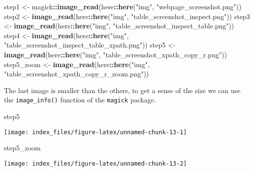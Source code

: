 \documentclass[
]{article}
\newenvironment{Shaded}{\begin{snugshade}}{\end{snugshade}}
\newcommand{\KeywordTok}[1]{\textcolor[rgb]{0.13,0.29,0.53}{\textbf{#1}}}
\newcommand{\NormalTok}[1]{#1}
\newcommand{\OperatorTok}[1]{\textcolor[rgb]{0.81,0.36,0.00}{\textbf{#1}}}
\newcommand{\StringTok}[1]{\textcolor[rgb]{0.31,0.60,0.02}{#1}}
\begin{document}
\begin{Shaded}
\begin{Highlighting}[]
\NormalTok{step1 <-}\StringTok{ }\NormalTok{magick}\OperatorTok{::}\KeywordTok{image_read}\NormalTok{(here}\OperatorTok{::}\KeywordTok{here}\NormalTok{(}\StringTok{"img"}\NormalTok{, }\StringTok{"webpage_screenshot.png"}\NormalTok{))}
\NormalTok{step2 <-}\StringTok{ }\KeywordTok{image_read}\NormalTok{(here}\OperatorTok{::}\KeywordTok{here}\NormalTok{(}\StringTok{"img"}\NormalTok{, }\StringTok{"table_screenshot_inspect.png"}\NormalTok{))}
\NormalTok{step3 <-}\StringTok{ }\KeywordTok{image_read}\NormalTok{(here}\OperatorTok{::}\KeywordTok{here}\NormalTok{(}\StringTok{"img"}\NormalTok{, }\StringTok{"table_screenshot_inspect_table.png"}\NormalTok{))}
\NormalTok{step4 <-}\StringTok{ }\KeywordTok{image_read}\NormalTok{(here}\OperatorTok{::}\KeywordTok{here}\NormalTok{(}\StringTok{"img"}\NormalTok{, }\StringTok{"table_screenshot_inspect_table_xpath.png"}\NormalTok{))}
\NormalTok{step5 <-}\StringTok{ }\KeywordTok{image_read}\NormalTok{(here}\OperatorTok{::}\KeywordTok{here}\NormalTok{(}\StringTok{"img"}\NormalTok{, }\StringTok{"table_screenshot_xpath_copy_r.png"}\NormalTok{))}
\NormalTok{step5_zoom <-}\StringTok{ }\KeywordTok{image_read}\NormalTok{(here}\OperatorTok{::}\KeywordTok{here}\NormalTok{(}\StringTok{"img"}\NormalTok{, }\StringTok{"table_screenshot_xpath_copy_r_zoom.png"}\NormalTok{))}
\end{Highlighting}
\end{Shaded}

The last image is smaller than the others, to get a sense of the size we
can use the \texttt{image\_info()} function of the \texttt{magick}
package.

\begin{Shaded}
\begin{Highlighting}[]
\NormalTok{step5}
\end{Highlighting}
\end{Shaded}

\begin{center}\texttt{[image: index\_files/figure-latex/unnamed-chunk-13-1]} \end{center}

\begin{Shaded}
\begin{Highlighting}[]
\NormalTok{step5_zoom}
\end{Highlighting}
\end{Shaded}

\begin{center}\texttt{[image: index\_files/figure-latex/unnamed-chunk-13-2]} \end{center}
\end{document}
